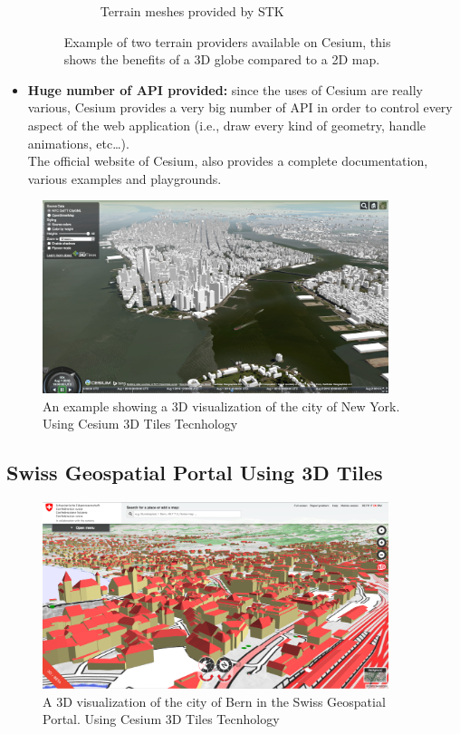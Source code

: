 \begin{itemize}
\begin{figure} [H]
\begin{subfigure}[b]{0.3\textwidth}
			\caption{Terrain meshes provided by STK}
			\label{fig:3D-Map}
		\end{subfigure}
		\caption{Example of two terrain providers available on Cesium, this shows the benefits of a 3D globe compared to a 2D map.}
	\end{figure}
	\item {\bf Huge number of API provided:} since the uses of Cesium are really various, Cesium provides a very big number of API in order to control every aspect of the web application (i.e., draw every kind of geometry, handle animations, etc\dots).\\The official website of Cesium, also provides a complete documentation, various examples and playgrounds.
\end{itemize}

\begin{figure} [H]
\centering
\includegraphics[width=0.9\textwidth]{chapter2/images/NewYorkCityCesium3dTiles}
\caption{An example showing a 3D visualization of the city of New York. Using Cesium 3D Tiles Tecnhology}
\label{fig:NewYorkCityCesium3dTiles}
\end{figure}
\subsection{Swiss Geospatial Portal Using 3D Tiles}
\begin{figure} [H]
\centering
\includegraphics[width=0.9\textwidth]{chapter2/images/BernCitySwissTopo}
\caption{A 3D visualization of the city of Bern in the Swiss Geospatial Portal. Using Cesium 3D Tiles Tecnhology}
\label{fig:BernCitySwissTopo}
\end{figure}